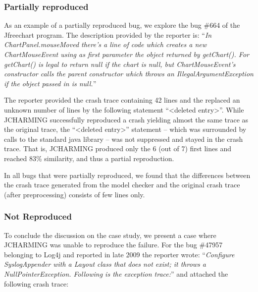 \subsubsection{Partially reproduced}

As an example of a partially reproduced bug, we explore the
bug \#664 of the Jfreechart program. The description provided
by the reporter is: ``{\it In ChartPanel.mouseMoved there's a line
of code which creates a new ChartMouseEvent using as first
parameter the object returned by getChart(). For getChart() is
legal to return null if the chart is null, but ChartMouseEvent's
constructor calls the parent constructor which throws an
IllegalArgumentException if the object passed in is null.}''

The reporter provided the crash trace containing 42 lines and
the replaced an unknown number of lines by the following
statement ``<deleted entry>''. While JCHARMING successfully reproduced a crash yielding almost the same trace
as the original trace, the ``<deleted entry>'' statement -- which
was surrounded by calls to the standard java library -- was not
suppressed and stayed in the crash trace. That is,
JCHARMING produced only the 6 (out of 7) first lines and
reached 83\% similarity, and thus a partial reproduction.

\noindent{}

In all bugs that were partially reproduced, we found that the
differences between the crash trace generated from the model
checker and the original crash trace (after preprocessing)
consists of few lines only.

\subsubsection{Not Reproduced}

To conclude the discussion on the case study, we present a
case where JCHARMING was unable to reproduce the failure.
For the bug \#47957 belonging to Log4j and reported in late
2009 the reporter wrote: ``{\it Configure SyslogAppender with a Layout class that does not
exist; it throws a NullPointerException. Following is the
exception trace:}'' and attached the following crash trace:

